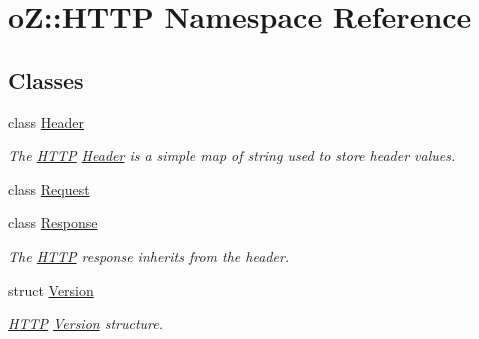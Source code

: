 \hypertarget{namespaceo_z_1_1_h_t_t_p}{}\section{oZ\+::H\+T\+TP Namespace Reference}
\label{namespaceo_z_1_1_h_t_t_p}
\subsection*{Classes}
\begin{DoxyCompactItemize}
\item 
class \mbox{\hyperlink{classo_z_1_1_h_t_t_p_1_1_header}{Header}}
\begin{DoxyCompactList}\small\item\em The \mbox{\hyperlink{namespaceo_z_1_1_h_t_t_p}{H\+T\+TP}} \mbox{\hyperlink{classo_z_1_1_h_t_t_p_1_1_header}{Header}} is a simple map of string used to store header values. \end{DoxyCompactList}\item 
class \mbox{\hyperlink{classo_z_1_1_h_t_t_p_1_1_request}{Request}}
\item 
class \mbox{\hyperlink{classo_z_1_1_h_t_t_p_1_1_response}{Response}}
\begin{DoxyCompactList}\small\item\em The \mbox{\hyperlink{namespaceo_z_1_1_h_t_t_p}{H\+T\+TP}} response inherits from the header. \end{DoxyCompactList}\item 
struct \mbox{\hyperlink{structo_z_1_1_h_t_t_p_1_1_version}{Version}}
\begin{DoxyCompactList}\small\item\em \mbox{\hyperlink{namespaceo_z_1_1_h_t_t_p}{H\+T\+TP}} \mbox{\hyperlink{structo_z_1_1_h_t_t_p_1_1_version}{Version}} structure. \end{DoxyCompactList}\end{DoxyCompactItemize}
